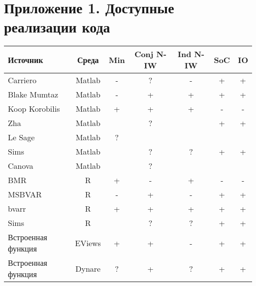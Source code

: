 \documentclass[11pt]{article} %
\begin{document}

\newpage
\printbibliography

\newpage


\section*{Приложение 1. Доступные реализации кода}

\begin{center}
\begin{tabular}{p{4cm}cccccc}
\toprule
Источник&  Среда&Min &  Conj N-IW & Ind N-IW & SoC &IO\\
\midrule
Carriero&Matlab&-&?&-&+&+ \\
Blake Mumtaz&Matlab&-&+&+&+&+ \\
Koop Korobilis&Matlab  & + & +  & + &- &- \\
Zha&Matlab&&?&&+&+\\
Le Sage&Matlab&?&&&&\\
Sims&Matlab&&?&?&+&+\\
Canova&Matlab&&?&&&\\
BMR&R& + & - & + & - & -  \\
MSBVAR&R & - & + & - & + & +  \\
bvarr&R  & + & + & + & + & +  \\
Sims&R&&?&?&+&+\\
Встроенная функция&EViews& + & + & - &+ &+ \\
Встроенная функция&Dynare& ? & +& ?& +&+  \\
\bottomrule
\end{tabular}
\end{center}
\end{document}
